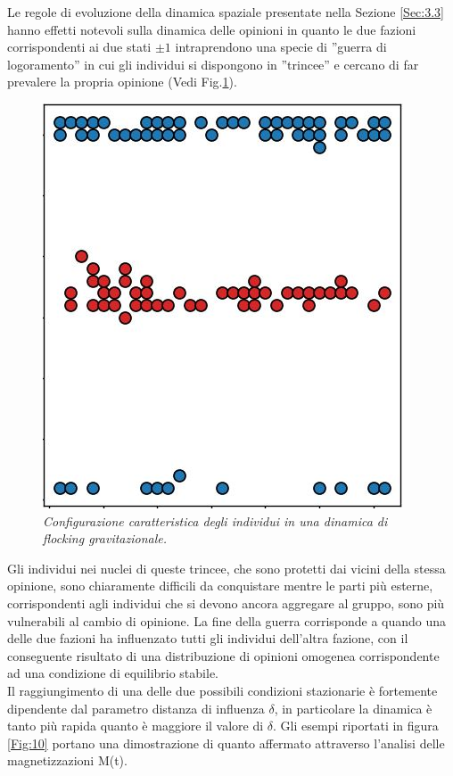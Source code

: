 \documentclass{article}
\begin{document}
Le regole di evoluzione della dinamica spaziale presentate nella Sezione \ref{Sec:3.3} hanno effetti notevoli sulla dinamica delle opinioni in quanto le due fazioni corrispondenti ai due stati $\pm1$ intraprendono una specie di ''guerra di logoramento'' in cui gli individui si dispongono in ''trincee'' e cercano di far prevalere la propria opinione (Vedi Fig.\ref{Fig:9}). 
\begin{figure}[h]
\centering
\includegraphics{trincea.jpg}
\caption{\textit{Configurazione caratteristica degli individui in una dinamica di flocking gravitazionale.}}
\label{Fig:9}

\end{figure}

Gli individui nei nuclei di queste trincee, che sono protetti dai vicini della stessa opinione, sono chiaramente difficili da conquistare mentre le parti più esterne, corrispondenti agli individui che si devono ancora aggregare al gruppo, sono più vulnerabili al cambio di opinione. La fine della guerra corrisponde a quando una delle due fazioni ha influenzato tutti gli individui dell'altra fazione, con il conseguente risultato di una distribuzione di opinioni omogenea corrispondente ad una condizione di equilibrio stabile. \\
Il raggiungimento di una delle due possibili condizioni stazionarie è fortemente dipendente dal parametro distanza di influenza $\delta$,  in particolare la dinamica è tanto più rapida quanto è maggiore il valore di $\delta$. Gli esempi riportati in figura \ref{Fig:10} portano una dimostrazione di quanto affermato attraverso l'analisi delle magnetizzazioni M(t).\\\\
\end{document}
